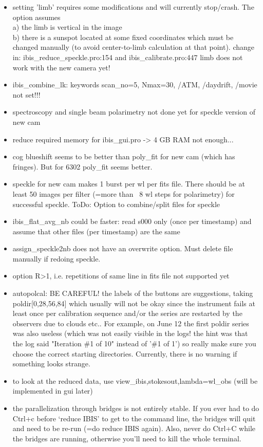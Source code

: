 \documentclass[a4paper,12pt]{article}
\begin{document}
\begin{itemize}
 \item setting 'limb' requires some modifications and will currently stop/crash. The option assumes\\
      a) the limb is vertical in the image\\
      b) there is a sunspot located at some fixed coordinates which must be changed manually 
         (to avoid center-to-limb calculation at that point). change in: \mbox{ibis\_reduce\_speckle.pro:154} and
            ibis\_calibrate.pro:447
     limb does not work with the new camera yet!

\item ibis\_combine\_lk: keywords scan\_no=5, Nmax=30, /ATM, /daydrift, /movie not set!!!
\item spectroscopy and single beam polarimetry not done yet for speckle version of new cam
\item reduce required memory for ibis\_gui.pro -> 4 GB RAM not enough...
\item cog blueshift seems to be better than poly\_fit for new cam (which has fringes). But for 6302 poly\_fit seems better.
\item speckle for new cam makes 1 burst per wl per fits file. There
  should be at least 50 images per filter (=more than ~8 wl steps for polarimetry) for successful speckle. ToDo: Option to combine/split files for speckle
\item ibis\_flat\_avg\_nb could be faster: read s000 only (once per
  timestamp) and assume that other files (per timestamp) are the same
\item assign\_speckle2nb does not have an overwrite option. Must delete file manually if redoing speckle.
\item option R>1, i.e. repetitions of same line in fits file not supported yet
\item autopolcal: BE CAREFUL! the labels of the buttons are suggestions, taking poldir[0,28,56,84]
    which usually will not be okay since the instrument fails at least once per calibration sequence
    and/or the series are restarted by the observers due to clouds etc.. For example, on June 12 the 
    first poldir series was also useless (which was not easily visible in the logs! the hint was that the
    log said "Iteration  \#1 of 10" instead of '\#1 of 1') so really make sure you choose the 
    correct starting directories. Currently, there is no warning if something looks strange.
\item to look at the reduced data, use view\_ibis,stokesout,lambda=wl\_obs (will be implemented in gui later)
\item the parallelization through bridges is not entirely stable. If you ever had to do Ctrl+c before `reduce IBIS' to get to the command line, the bridges will quit and need to be re-run (=do reduce IBIS again). Also, never do Ctrl+C while the bridges are running, otherwise you'll need to kill the whole terminal.
\end{itemize}
\end{document}
